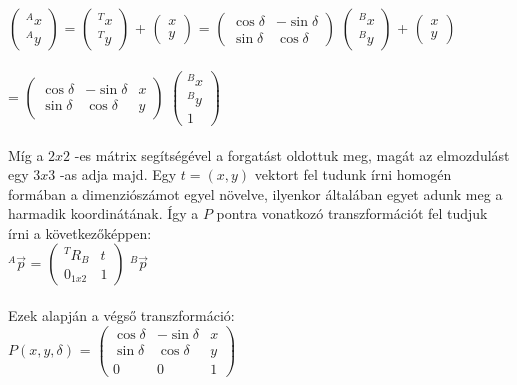 \(
\begin{pmatrix}
	{}^{A}x\\
	{}^{A}y
\end{pmatrix}	 
\) = 
\(
\begin{pmatrix}
	{}^{T}x\\
	{}^{T}y
\end{pmatrix}	 
\) + 
\(
\begin{pmatrix}
	x\\
	y
\end{pmatrix}
\) =
\(
\begin{pmatrix}
	\cos\delta & -\sin\delta\\
	\sin\delta & \cos\delta
\end{pmatrix}
\)
\(
\begin{pmatrix}
	{}^{B}x\\
	{}^{B}y
\end{pmatrix}	 
\) + 
\(
\begin{pmatrix}
	x\\
	y
\end{pmatrix}	 
\)\\\\ = 
\(
	\begin{pmatrix}
		\cos\delta & -\sin\delta & x\\
		\sin\delta & \cos\delta & y
	\end{pmatrix}
\)
\(
\begin{pmatrix}
	{}^{B}x\\
	{}^{B}y\\
	1
\end{pmatrix}	 
\)\\\\
Míg a $2 x 2$ -es mátrix segítségével a forgatást oldottuk meg, magát az elmozdulást egy $ 3 x 3 $ -as adja majd. Egy $t = (x, y) $ vektort fel tudunk írni homogén formában a dimenziószámot egyel növelve, ilyenkor általában egyet adunk meg a harmadik koordinátának. Így a $ P $ pontra vonatkozó transzformációt fel tudjuk írni a következőképpen:\\

$ {}^{A}\vec{p} $ = 
\(
\begin{pmatrix}
	{}^{T}R{}_{B} & t\\
	0_{1x2} & 1
\end{pmatrix}	 
\)
$ {}^{B}\vec{p} $\\\\
Ezek alapján a végső transzformáció:\\

$P(x, y, \delta)$ = 
\(
	\begin{pmatrix}
		\cos\delta & -\sin\delta & x\\
		\sin\delta & \cos\delta & y\\
		0 & 0 & 1
	\end{pmatrix}
\) 
